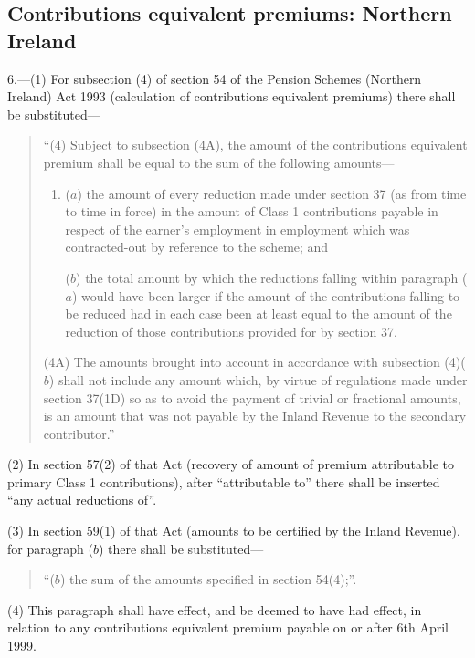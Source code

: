 \documentclass[12pt,a4paper]{article}
\begin{document}
\subsection*{Contributions equivalent premiums: Northern Ireland}

6.---(1) For subsection (4)  of section 54 of the Pension Schemes (Northern Ireland) Act 1993 (calculation of contributions equivalent premiums) there shall be substituted—
\begin{quotation}
“(4) Subject to subsection (4A), the amount of the contributions equivalent premium shall be equal to the sum of the following amounts—
\begin{enumerate}\item[]
($a$) the amount of every reduction made under section 37 (as from time to time in force) in the amount of Class 1 contributions payable in respect of the earner’s employment in employment which was contracted-out by reference to the scheme; and

($b$) the total amount by which the reductions falling within paragraph ($a$)  would have been larger if the amount of the contributions falling to be reduced had in each case been at least equal to the amount of the reduction of those contributions provided for by section 37. 
\end{enumerate}

(4A) The amounts brought into account in accordance with subsection (4)($b$)  shall not include any amount which, by virtue of regulations made under section 37(1D) so as to avoid the payment of trivial or fractional amounts, is an amount that was not payable by the Inland Revenue to the secondary contributor.”
\end{quotation}

(2) In section 57(2)  of that Act (recovery of amount of premium attributable to primary Class 1 contributions), after “attributable to” there shall be inserted “any actual reductions of”.

(3) In section 59(1)  of that Act (amounts to be certified by the Inland Revenue), for paragraph ($b$)  there shall be substituted—
\begin{quotation}
“($b$) the sum of the amounts specified in section 54(4);”.
\end{quotation}

(4) This paragraph shall have effect, and be deemed to have had effect, in relation to any contributions equivalent premium payable on or after 6th April 1999. 

%
\end{document}
